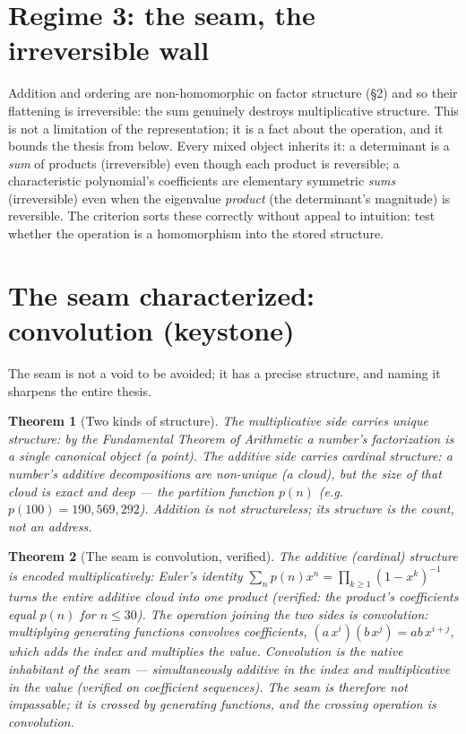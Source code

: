 \documentclass[11pt]{article}
\newtheorem{theorem}{Theorem}\newtheorem{proposition}{Proposition}
\begin{document}
\section{Regime 3: the seam, the irreversible wall}

Addition and ordering are non-homomorphic on factor structure (\S2) and so their flattening is irreversible:
the sum genuinely destroys multiplicative structure. This is not a limitation of the representation; it is a
fact about the operation, and it bounds the thesis from below. Every mixed object inherits it: a determinant
is a \emph{sum} of products (irreversible) even though each product is reversible; a characteristic
polynomial's coefficients are elementary symmetric \emph{sums} (irreversible) even when the eigenvalue
\emph{product} (the determinant's magnitude) is reversible. The criterion sorts these correctly without
appeal to intuition: test whether the operation is a homomorphism into the stored structure.

\section{The seam characterized: convolution (keystone)}

The seam is not a void to be avoided; it has a precise structure, and naming it sharpens the entire thesis.

\begin{theorem}[Two kinds of structure]
The multiplicative side carries \emph{unique} structure: by the Fundamental Theorem of Arithmetic a number's
factorization is a single canonical object (a point). The additive side carries \emph{cardinal} structure:
a number's additive decompositions are non-unique (a cloud), but the \emph{size} of that cloud is exact and
deep --- the partition function $p(n)$ (e.g.\ $p(100)=190{,}569{,}292$). Addition is not structureless; its
structure is the count, not an address.
\end{theorem}

\begin{theorem}[The seam is convolution, verified]
The additive (cardinal) structure is encoded multiplicatively: Euler's identity
$\sum_n p(n)x^n=\prod_{k\ge 1}(1-x^k)^{-1}$ turns the entire additive cloud into one product (verified: the
product's coefficients equal $p(n)$ for $n\le 30$). The operation joining the two sides is
\emph{convolution}: multiplying generating functions convolves coefficients,
$(a\,x^i)(b\,x^j)=ab\,x^{i+j}$, which \emph{adds} the index and \emph{multiplies} the value. Convolution is
the native inhabitant of the seam --- simultaneously additive in the index and multiplicative in the value
(verified on coefficient sequences). The seam is therefore not impassable; it is crossed by generating
functions, and the crossing operation is convolution.
\end{theorem}
\end{document}
